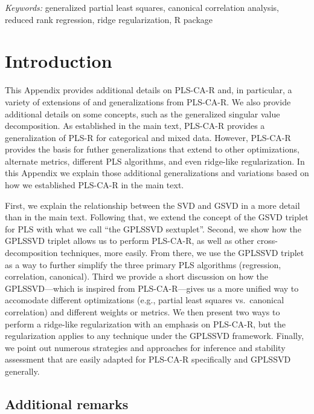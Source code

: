 \documentclass[12pt]{article}
\begin{document}
\noindent%
{\it Keywords:} generalized partial least squares, canonical correlation analysis, reduced rank regression, ridge regularization, R package
\vfill

\newpage
{} %

\hypertarget{introduction}{%
\section{Introduction}\label{introduction}}

This Appendix provides additional details on PLS-CA-R and, in
particular, a variety of extensions of and generalizations from
PLS-CA-R. We also provide additional details on some concepts, such as
the generalized singular value decomposition. As established in the main
text, PLS-CA-R provides a generalization of PLS-R for categorical and
mixed data. However, PLS-CA-R provides the basis for futher
generalizations that extend to other optimizations, alternate metrics,
different PLS algorithms, and even ridge-like regularization. In this
Appendix we explain those additional generalizations and variations
based on how we established PLS-CA-R in the main text.

First, we explain the relationship between the SVD and GSVD in a more
detail than in the main text. Following that, we extend the concept of
the GSVD triplet for PLS with what we call ``the GPLSSVD sextuplet''.
Second, we show how the GPLSSVD triplet allows us to perform PLS-CA-R,
as well as other cross-decomposition techniques, more easily. From
there, we use the GPLSSVD triplet as a way to further simplify the three
primary PLS algorithms (regression, correlation, canonical). Third we
provide a short discussion on how the GPLSSVD---which is inspired from
PLS-CA-R---gives us a more unified way to accomodate different
optimizations (e.g., partial least squares vs.~canonical correlation)
and different weights or metrics. We then present two ways to perform a
ridge-like regularization with an emphasis on PLS-CA-R, but the
regularization applies to any technique under the GPLSSVD framework.
Finally, we point out numerous strategies and approaches for inference
and stability assessment that are easily adapted for PLS-CA-R
specifically and GPLSSVD generally.

\hypertarget{additional-remarks}{%
\subsection{Additional remarks}\label{additional-remarks}}
\end{document}

